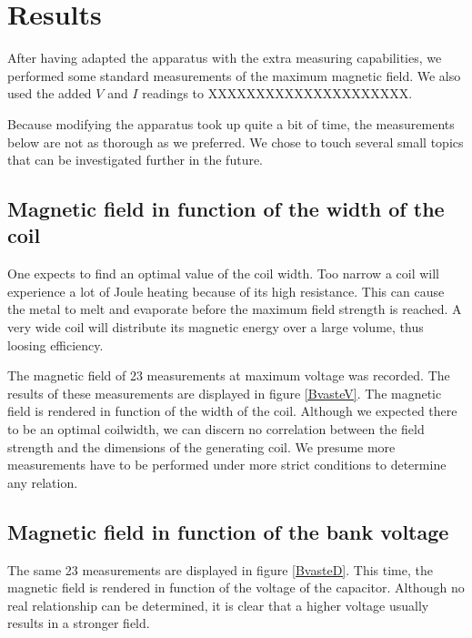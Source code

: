 \section{Results}
After having adapted the apparatus with the extra measuring capabilities, 
we performed some standard measurements of the maximum magnetic field. We 
also used the added $V$ and $I$ readings to XXXXXXXXXXXXXXXXXXXXX.

Because modifying the apparatus took up quite a bit of time, the 
measurements below are not as thorough as we preferred. We chose to touch 
several small topics that can be investigated further in the future.

\subsection{Magnetic field in function of the width of the coil}
One expects to find an optimal value of the coil width. Too narrow a coil 
will experience a lot of Joule heating because of its high resistance. This 
can cause the metal to melt and evaporate before the maximum field strength 
is reached. A very wide coil will distribute its magnetic energy over a 
large volume, thus loosing efficiency.

The magnetic field of 23 measurements at maximum voltage was recorded. The 
results of these measurements are displayed in figure \ref{BvasteV}. The 
magnetic field is rendered in function of the width of the coil. Although 
we expected there to be an optimal coilwidth, we can discern no correlation 
between the field strength and the dimensions of the generating coil. We 
presume more measurements have to be performed under more strict conditions 
to determine any relation.


\subsection{Magnetic field in function of the bank voltage}

The same 23 measurements are displayed in figure \ref{BvasteD}. This time, the 
magnetic field is rendered in function of the voltage of the capacitor.  
Although no real relationship can be determined, it is clear that a higher 
voltage usually results in a stronger field.


